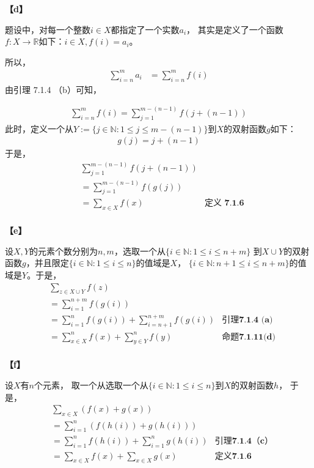 \documentclass{article}
\theoremstyle{mystyle}
\begin{document}
\textbf{【d】}

题设中，对每一个整数$i \in X$都指定了一个实数$a_i$，
其实是定义了一个函数$f:X \rightarrow \mathbb{R}$如下：$i \in X, f(i) = a_i$。

所以，
\begin{align*}
        \sum\limits_{i=n}^m a_i & =\sum\limits_{i=n}^m f(i)
\end{align*}
由引理 7.1.4 （b）可知，

\begin{align*}
        \sum\limits_{i=n}^m f(i) = \sum\limits_{j=1}^{m-(n-1)} f(j+(n-1))
\end{align*}
此时，定义一个从$Y := \{j \in \mathbb{N}: 1 \leq j \leq m-(n-1)\}$到$X$的双射函数$g$如下：
\begin{align*}
        g(j) = j+(n-1)
\end{align*}
于是，
\begin{align*}
         & \sum\limits_{j=1}^{m-(n-1)} f(j+(n-1))                     \\
         & =\sum\limits_{j=1}^{m-(n-1)} f(g(j))                       \\
         & =\sum\limits_{x \in X} f(x)            & \textbf{定义 7.1.6} \\
\end{align*}

\textbf{【e】}

设$X,Y$的元素个数分别为$n,m$，选取一个从$\{i \in \mathbb{N}: 1 \leq i \leq n+m\}$
到$X \cup Y$的双射函数$g$，并且限定$\{i \in \mathbb{N}: 1 \leq i \leq n\}$的值域是$X$，
$\{i \in \mathbb{N}: n+1 \leq i \leq n+m\}$的值域是$Y$。于是，
\begin{align*}
         & \sum \limits_{z \in X \cup Y} f(z)                                                           \\
         & = \sum \limits_{i=1}^{n+m} f(g(i))                                                           \\
         & = \sum \limits_{i=1}^{n} f(g(i)) + \sum \limits_{i=n+1}^{n+m} f(g(i)) & \textbf{引理7.1.4 (a)} \\
         & = \sum \limits_{x \in X}^{n} f(x) + \sum \limits_{y \in Y}^{n} f(y)   & \textbf{命题7.1.11(d)} \\
\end{align*}

\textbf{【f】}

设$X$有$n$个元素，
取一个从选取一个从$\{i \in \mathbb{N}: 1 \leq i \leq n\}$到$X$的双射函数$h$，
于是，
\begin{align*}
         & \sum \limits_{x \in X} (f(x) + g(x))                                                \\
         & = \sum \limits_{i=1}^n (f(h(i)) + g(h(i)))                                          \\
         & = \sum \limits_{i=1}^n f(h(i)) + \sum \limits_{i=1}^n g(h(i)) & \textbf{引理7.1.4（c）} \\
         & = \sum \limits_{x \in X} f(x) +\sum \limits_{x \in X} g(x)    & \textbf{定义7.1.6}    \\
\end{align*}
\end{document}
